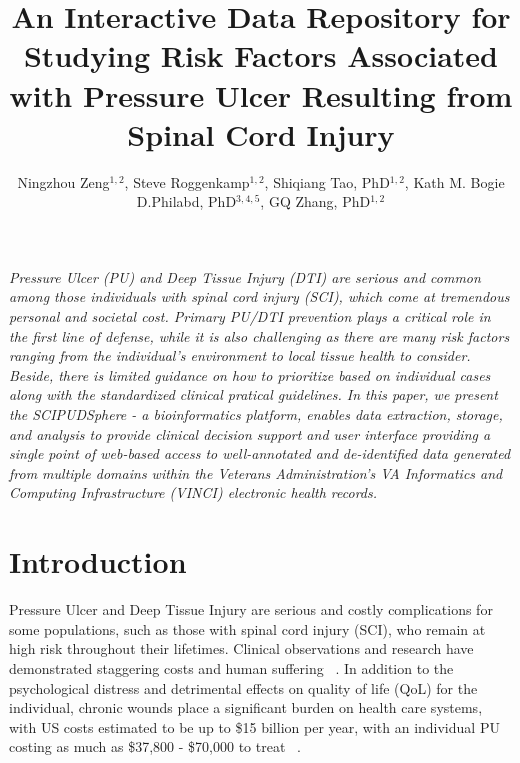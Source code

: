 \documentclass{amia}
\begin{document}
\title{An Interactive Data Repository for Studying Risk Factors Associated with Pressure Ulcer Resulting from Spinal Cord Injury}

\author{Ningzhou Zeng$^{1,2}$, Steve Roggenkamp$^{1,2}$, Shiqiang Tao, PhD$^{1,2}$, Kath M. Bogie D.Philabd, PhD$^{3,4,5}$, GQ Zhang, PhD$^{1,2}$}


\maketitle


\textit{Pressure Ulcer (PU) and Deep Tissue Injury (DTI) are serious and common among those individuals with spinal cord injury (SCI), which come at tremendous personal and societal cost. Primary PU/DTI prevention plays a critical role in the first line of defense, while it is also challenging as there are many risk factors ranging from the individual’s environment to local tissue health to consider. Beside, there is limited guidance on how to prioritize based on individual cases along with the standardized clinical pratical guidelines. In this paper, we present the SCIPUDSphere - a bioinformatics platform, enables data extraction, storage, and analysis to provide clinical decision support and user interface providing a single point of web-based access to well-annotated and de-identified data generated from multiple domains within the Veterans Administration's VA Informatics and Computing Infrastructure (VINCI) electronic health records.}

\section{Introduction}
Pressure Ulcer and Deep Tissue Injury are serious and costly complications for some populations, such as those with spinal cord injury (SCI), who remain at high risk throughout their lifetimes. Clinical observations and research have demonstrated staggering costs and human suffering ~\cite{ref1,ref2,ref3}. In addition to the psychological distress and detrimental effects on quality of life (QoL) for the individual, chronic wounds place a significant burden on health care systems, with US costs estimated to be up to \$15 billion per year, with an individual PU costing as much as \$37,800 - \$70,000 to treat  ~\cite{ref4,ref5,ref6}.
\end{document}
